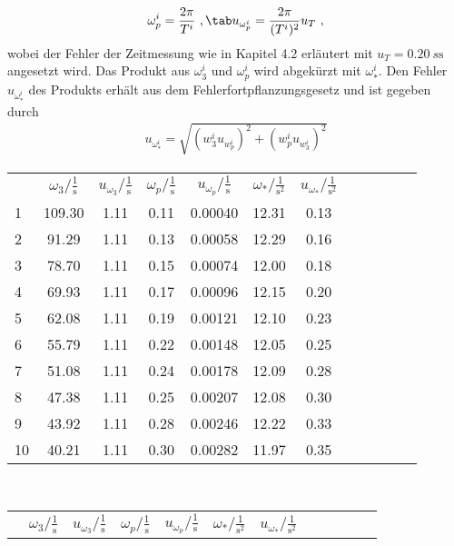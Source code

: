 \begin{gather}
    \omega_p^i=\frac{2\pi}{T^i}~,\tab u_{\omega_p^i}=\frac{2\pi}{(T^i)^2}u_T~,
\end{gather}
wobei der Fehler der Zeitmessung wie in Kapitel 4.2 erläutert mit $u_T=0.20~s\text{s}$ angesetzt wird. Das Produkt aus $\omega_3^i$ und $\omega_p^i$ wird abgekürzt mit $\omega_*^i$. Den Fehler $u_{\omega_*^i}$ des Produkts erhält aus dem Fehlerfortpflanzungsgesetz und ist gegeben durch
\begin{align}
    u_{\omega_\ast^i}=\sqrt{(w_3^i u_{w_p^i})^2+(w_p^i u_{w_3^i})^2}
\end{align}
\begin{center}
    \begin{tabular}{gccccccccccc}
         &      $\omega_3/\frac{1}{\text{s}}$ &  $u_{\omega_3}/\frac{1}{\text{s}}$ &    $\omega_p/\frac{1}{\text{s}}$ &     $u_{\omega_p}/\frac{1}{\text{s}}$ &     $\omega_*/\frac{1}{\text{s}^2}$&  $u_{\omega_*}/\frac{1}{\text{s}^2}$\\
        1  &  109.30 &  1.11 &  0.11 &  0.00040 &  12.31 &  0.13 \\
        2  &   91.29 &  1.11 &  0.13 &  0.00058 &  12.29 &  0.16 \\
        3  &   78.70 &  1.11 &  0.15 &  0.00074 &  12.00 &  0.18 \\
        4  &   69.93 &  1.11 &  0.17 &  0.00096 &  12.15 &  0.20 \\
        5  &   62.08 &  1.11 &  0.19 &  0.00121 &  12.10 &  0.23 \\
        6  &   55.79 &  1.11 &  0.22 &  0.00148 &  12.05 &  0.25 \\
        7  &   51.08 &  1.11 &  0.24 &  0.00178 &  12.09 &  0.28 \\
        8  &   47.38 &  1.11 &  0.25 &  0.00207 &  12.08 &  0.30 \\
        9  &   43.92 &  1.11 &  0.28 &  0.00246 &  12.22 &  0.33 \\
        10 &   40.21 &  1.11 &  0.30 &  0.00282 &  11.97 &  0.35 \\
    \end{tabular}\\
    \begin{tabular}{gccccccccccc}
         &      $\omega_3/\frac{1}{\text{s}}$ &  $u_{\omega_3}/\frac{1}{\text{s}}$ &    $\omega_p/\frac{1}{\text{s}}$ &     $u_{\omega_p}/\frac{1}{\text{s}}$ &     $\omega_*/\frac{1}{\text{s}^2}$&  $u_{\omega_*}/\frac{1}{\text{s}^2}$\\

\end{tabular}
\end{center}
